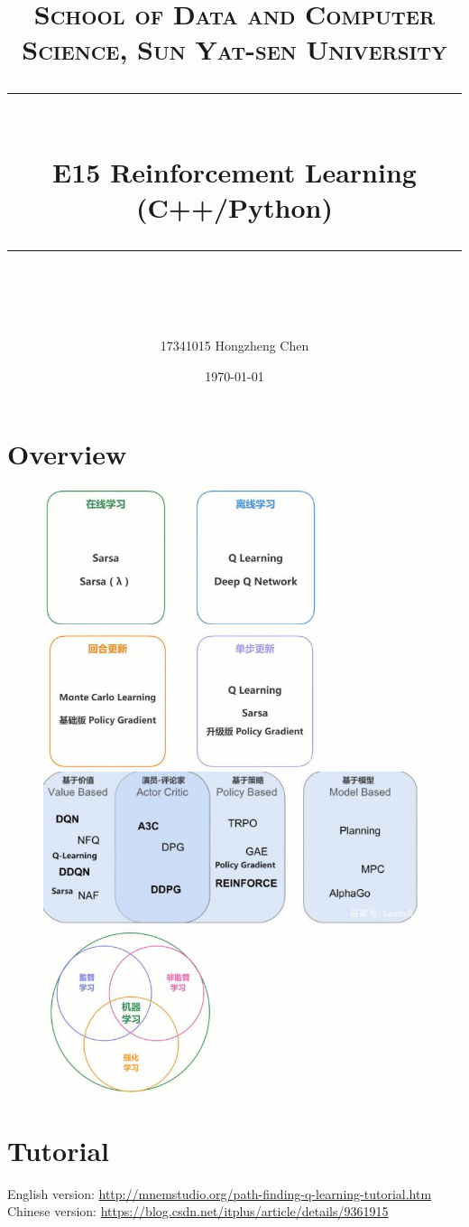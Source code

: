 \documentclass[a4paper, 11pt]{article}
\title{
\normalfont \normalsize
\textsc{School of Data and Computer Science, Sun Yat-sen University} \\ [25pt] %
\rule{\textwidth}{0.5pt} \\[0.4cm] %
\huge  E15 Reinforcement Learning (C++/Python)\\ %
\rule{\textwidth}{2pt} \\[0.5cm] %
\author{17341015 Hongzheng Chen}
\date{\normalsize\today}
}
\begin{document}
\maketitle
\tableofcontents
\newpage
\section{Overview}
\begin{figure}[H]
\centering
\includegraphics[width=8cm]{fig/on_off}
\quad
\includegraphics[width=8cm]{fig/update}
\includegraphics[width=11cm]{fig/base}
\quad
\includegraphics[width=5cm]{fig/relation}
\end{figure}
\section{Tutorial}
English version: \url{http://mnemstudio.org/path-finding-q-learning-tutorial.htm}\\
Chinese version: \url{https://blog.csdn.net/itplus/article/details/9361915}
\end{document}
